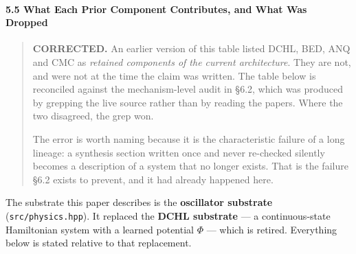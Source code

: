 \documentclass[
  11pt,
  a4paper,
]{article}
\begin{document}
\paragraph{5.5 What Each Prior Component Contributes, and What Was
Dropped}\label{what-each-prior-component-contributes-and-what-was-dropped}

\begin{quote}
\textbf{CORRECTED.} An earlier version of this table listed DCHL, BED,
ANQ and CMC as \emph{retained components of the current architecture}.
They are not, and were not at the time the claim was written. The table
below is reconciled against the mechanism-level audit in §6.2, which was
produced by grepping the live source rather than by reading the papers.
Where the two disagreed, the grep won.

The error is worth naming because it is the characteristic failure of a
long lineage: a synthesis section written once and never re-checked
silently becomes a description of a system that no longer exists. That
is the failure §6.2 exists to prevent, and it had already happened here.
\end{quote}

The substrate this paper describes is the \textbf{oscillator substrate}
(\texttt{src/physics.hpp}). It replaced the \textbf{DCHL substrate} ---
a continuous-state Hamiltonian system with a learned potential \(\Phi\)
--- which is retired. Everything below is stated relative to that
replacement.
\end{document}
